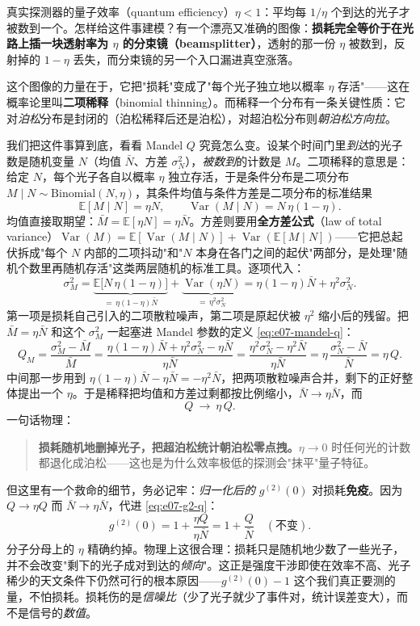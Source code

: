 真实探测器的量子效率（quantum efficiency）\(\eta<1\)：平均每 \(1/\eta\) 个到达的光子才被数到一个。怎样给这件事建模？有一个漂亮又准确的图像：\textbf{损耗完全等价于在光路上插一块透射率为 \(\eta\) 的分束镜（beamsplitter）}，透射的那一份 \(\eta\) 被数到，反射掉的 \(1-\eta\) 丢失，而分束镜的另一个入口漏进真空涨落。

这个图像的力量在于，它把"损耗"变成了"每个光子独立地以概率 \(\eta\) 存活"——这在概率论里叫\textbf{二项稀释}（binomial thinning）。而稀释一个分布有一条关键性质：它对\emph{泊松}分布是封闭的（泊松稀释后还是泊松），对超泊松分布则\emph{朝泊松方向拉}。

我们把这件事算到底，看看 Mandel \(Q\) 究竟怎么变。设某个时间门里\emph{到达}的光子数是随机变量 \(N\)（均值 \(\bar N\)、方差 \(\sigma_N^2\)），\emph{被数到}的计数是 \(M\)。二项稀释的意思是：给定 \(N\)，每个光子各自以概率 \(\eta\) 独立存活，于是条件分布是二项分布 \(M\mid N\sim\mathrm{Binomial}(N,\eta)\)，其条件均值与条件方差是二项分布的标准结果
\[
  \mathbb E[M\mid N]=\eta N,\qquad
  \operatorname{Var}(M\mid N)=N\,\eta(1-\eta).
\]
均值直接取期望：\(\bar M=\mathbb E[\eta N]=\eta\bar N\)。方差则要用\textbf{全方差公式}（law of total variance）\(\operatorname{Var}(M)=\mathbb E[\operatorname{Var}(M\mid N)]+\operatorname{Var}(\mathbb E[M\mid N])\)——它把总起伏拆成"每个 \(N\) 内部的二项抖动"和"\(N\) 本身在各门之间的起伏"两部分，是处理"随机个数里再随机存活"这类两层随机的标准工具。逐项代入：
\[
  \sigma_M^2
  =\underbrace{\mathbb E\big[N\,\eta(1-\eta)\big]}_{=\,\eta(1-\eta)\bar N}
  +\underbrace{\operatorname{Var}(\eta N)}_{=\,\eta^2\sigma_N^2}
  =\eta(1-\eta)\bar N+\eta^2\sigma_N^2 .
\]
第一项是损耗自己引入的二项散粒噪声，第二项是原起伏被 \(\eta^2\) 缩小后的残留。把 \(\bar M=\eta\bar N\) 和这个 \(\sigma_M^2\) 一起塞进 Mandel 参数的定义 \eqref{eq:e07-mandel-q}：
\[
  Q_M=\frac{\sigma_M^2-\bar M}{\bar M}
  =\frac{\eta(1-\eta)\bar N+\eta^2\sigma_N^2-\eta\bar N}{\eta\bar N}
  =\frac{\eta^2\sigma_N^2-\eta^2\bar N}{\eta\bar N}
  =\eta\,\frac{\sigma_N^2-\bar N}{\bar N}=\eta\,Q .
\]
中间那一步用到 \(\eta(1-\eta)\bar N-\eta\bar N=-\eta^2\bar N\)，把两项散粒噪声合并，剩下的正好整体提出一个 \(\eta\)。于是稀释把均值和方差过剩都按比例缩小，\(\bar N\to\eta\bar N\)，而
\[
  Q\ \longrightarrow\ \eta\,Q .
\]
一句话物理：

\begin{quote}
\textbf{损耗随机地删掉光子，把超泊松统计朝泊松零点拽。}\(\eta\to0\) 时任何光的计数都退化成泊松——这也是为什么效率极低的探测会"抹平"量子特征。
\end{quote}

但这里有一个救命的细节，务必记牢：\emph{归一化后的} \(g^{(2)}(0)\) 对损耗\textbf{免疫}。因为 \(Q\to\eta Q\) 而 \(\bar N\to\eta\bar N\)，代进 \eqref{eq:e07-g2-q}：
\[
  g^{(2)}(0)=1+\frac{\eta Q}{\eta\bar N}=1+\frac{Q}{\bar N}\quad(\text{不变}).
\]
分子分母上的 \(\eta\) 精确约掉。物理上这很合理：损耗只是随机地少数了一些光子，并不会改变"剩下的光子成对到达的\emph{倾向}"。这正是强度干涉即使在效率不高、光子稀少的天文条件下仍然可行的根本原因——\(g^{(2)}(0)-1\) 这个我们真正要测的量，不怕损耗。损耗伤的是\emph{信噪比}（少了光子就少了事件对，统计误差变大），而不是信号的\emph{数值}。

